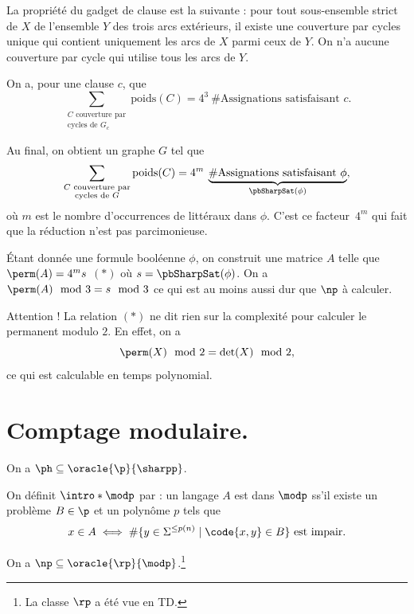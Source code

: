 \documentclass[./main]{subfiles}
\begin{document}
  La propriété du gadget de clause est la suivante :
  pour tout sous-ensemble strict de $X$ de l'ensemble $Y$ des trois arcs extérieurs, il existe une couverture par cycles unique qui contient uniquement les arcs de $X$ parmi ceux de $Y$. 
  On n'a aucune couverture par cycle qui utilise tous les arcs de $Y$.

  On a, pour une clause $c$, que 
  \[
    \sum_{\substack{\text{$C$ couverture par}\\ \text{cycles de $G_c$}}} \mathrm{poids}(C) = 4^3 \: \# \text{Assignations satisfaisant $c$}
  .\] 


  Au final, on obtient un graphe $G$ tel que
  \[
    \sum_{\substack{\text{$C$ couverture par}\\ \text{cycles de $G$}}} \mathrm{poids}(C) = 4^m \: \underbrace{\# \text{Assignations satisfaisant $\phi$}}_{\pbSharpSat(\phi)}
  ,\]
  où $m$ est le nombre d'occurrences de littéraux dans $\phi$.
  C'est ce facteur~$4^m$ qui fait que la réduction n'est pas parcimonieuse.


  \begin{rmk}
    Étant donnée une formule booléenne $\phi$, on construit une matrice  $A$ telle que $\perm(A) = 4^m  s$ $(*)$ où $s = \pbSharpSat(\phi)$.
    On a  $\perm(A) \mod 3 = s \mod 3$ ce qui est au moins aussi dur que $\np$ à calculer.

    Attention ! La relation $(*)$ ne dit rien sur la complexité pour calculer le permanent modulo $2$.
    En effet, on a \[
    \perm (X) \mod 2 = \det (X) \mod 2
    ,\] 
    ce qui est calculable en temps polynomial.
  \end{rmk}

  \section{Comptage modulaire.}

  \begin{thm}[Toda]
    On a $\ph \subseteq \oracle{\p}{\sharpp}$.
  \end{thm}

  \begin{defn}
    On définit $\intro*\modp$ par : un langage $A$ est dans $\modp$ ss'il existe un problème $B \in \p$ et un polynôme $p$ tels que \[
    x \in A \iff \# \{y \in \Sigma^{\le p(n)}  \mid \code{x,y} \in B\} \text{ est impair}
    .\]
  \end{defn}

  \begin{thm}
    On a $\np \subseteq \oracle{\rp}{\modp}$.\footnote{La classe $\rp$ a été vue en TD.}
    \label{thm:mod-thm1}
  \end{thm}
\end{document}
